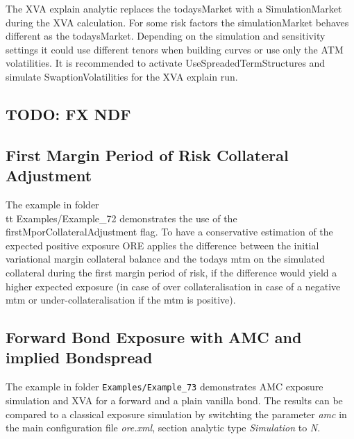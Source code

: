 The XVA explain analytic replaces the todaysMarket with a SimulationMarket during the XVA calculation. For some risk factors the simulationMarket behaves
different as the todaysMarket. Depending on the simulation and sensitivity settings it could use different tenors when building curves
or use only the ATM volatilities. It is recommended to activate UseSpreadedTermStructures and simulate SwaptionVolatilities for the
XVA explain run.

\subsection{TODO: FX NDF}%
\label{example:71}

\subsection{First Margin Period of Risk Collateral Adjustment}%
\label{example:72}

The example in folder {\\tt Examples/Example\_72} demonstrates the use of the firstMporCollateralAdjustment flag.
To have a conservative estimation of the expected positive exposure ORE applies the difference between the initial variational margin
collateral balance and the todays mtm on the simulated collateral during the first margin period of risk, if the difference would yield
a higher expected exposure (in case of over collateralisation in case of a negative mtm or under-collateralisation if the mtm is positive).

\subsection{Forward Bond Exposure with AMC and implied Bondspread}%
\label{example:73}

The example in folder {\tt Examples/Example\_73} demonstrates AMC exposure simulation and XVA for a forward and a plain vanilla bond.
The results can be compared to a classical exposure simulation by switchting the parameter \emph{amc} in the main configuration
file \emph{ore.xml}, section analytic type \emph{Simulation} to \emph{N}.

